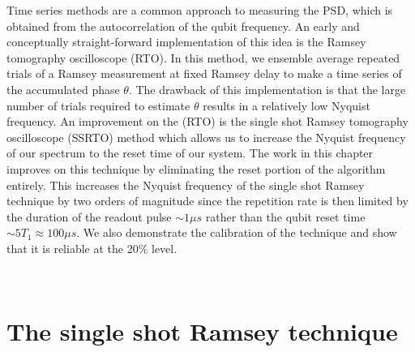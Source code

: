 Time series methods are a common approach to measuring the PSD, which is obtained from the autocorrelation of the qubit frequency.
An early and conceptually straight-forward implementation of this idea is the Ramsey tomography oscilloscope (RTO). 
In this method, we ensemble average repeated trials of a Ramsey measurement at fixed Ramsey delay to make a time series of the accumulated phase $\theta$.
The drawback of this implementation is that the large number of trials required to estimate $\theta$ results in a relatively low Nyquist frequency.
An improvement on the (RTO) is the single shot Ramsey tomography oscilloscope (SSRTO) method 
which allows us to increase the Nyquist frequency of our spectrum to the reset time of our system.
The work in this chapter improves on this technique by eliminating the reset portion of the algorithm entirely.
This increases the Nyquist frequency of the single shot Ramsey technique by two orders of magnitude since the repetition rate is then limited by the duration of the readout pulse $\sim 1 \mu s$ rather than the qubit reset time $\sim 5 T_1 \approx 100 \mu s$.
We also demonstrate the calibration of the technique and show that it is reliable at the 20\% level.

\\

\section{The single shot Ramsey technique}

